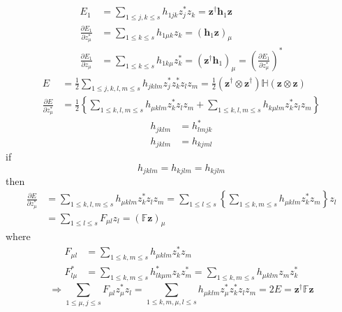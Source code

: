 \documentclass[aps,preprint]{revtex4}%
\begin{document}
\begin{align}
E_{1}  & =\sum_{1\leq j,k\leq s}h_{1jk}z_{j}^{\ast}z_{k}=\mathbf{z}^{\dagger
}\mathbf{h}_{1}\mathbf{z}\\
\frac{\partial E_{1}}{\partial z_{\mu}^{\ast}}  & =\sum_{1\leq k\leq s}h_{1\mu
k}z_{k}=\left(  \mathbf{h}_{1}\mathbf{z}\right)  _{\mu}\\
\frac{\partial E_{1}}{\partial z_{\mu}}  & =\sum_{1\leq k\leq s}h_{1k\mu}%
z_{k}^{\ast}=\left(  \mathbf{z}^{\dagger}\mathbf{h}_{1}\right)  _{\mu}=\left(
\frac{\partial E_{1}}{\partial z_{\mu}^{\ast}}\right)  ^{\ast}%
\end{align}%
\begin{align}
E  & =\frac{1}{2}\sum_{1\leq j,k,l,m\leq s}h_{jklm}z_{j}^{\ast}z_{k}^{\ast
}z_{l}z_{m}=\frac{1}{2}\left(  \mathbf{z}^{\dagger}\otimes\mathbf{z}^{\dagger
}\right)  \mathbb{H}\left(  \mathbf{z\otimes z}\right)  \\
\frac{\partial E}{\partial z_{\mu}^{\ast}}  & =\frac{1}{2}\left\{  \sum_{1\leq
k,l,m\leq s}h_{\mu klm}z_{k}^{\ast}z_{l}z_{m}+\sum_{1\leq k,l,m\leq s}h_{k\mu
lm}z_{k}^{\ast}z_{l}z_{m}\right\}
\end{align}%
\begin{align}
h_{jklm}  & =h_{lmjk}^{\ast}\\
h_{jklm}  & =h_{kjml}%
\end{align}
if
\begin{equation}
h_{jklm}=h_{kjlm}=h_{kjlm}%
\end{equation}
then
\begin{align}
\frac{\partial E}{\partial z_{\mu}^{\ast}}  & =\sum_{1\leq k,l,m\leq s}h_{\mu
klm}z_{k}^{\ast}z_{l}z_{m}=\sum_{1\leq l\leq s}\left\{  \sum_{1\leq k,m\leq
s}h_{\mu klm}z_{k}^{\ast}z_{m}\right\}  z_{l}\\
& =\sum_{1\leq l\leq s}F_{\mu l}z_{l}=\left(  \mathbb{F}\mathbf{z}\right)
_{\mu}%
\end{align}
where
\begin{align}
F_{\mu l}  & =\sum_{1\leq k,m\leq s}h_{\mu klm}z_{k}^{\ast}z_{m}\\
F_{l\mu}^{\ast}  & =\sum_{1\leq k,m\leq s}h_{lk\mu m}^{\ast}z_{k}z_{m}^{\ast
}=\sum_{1\leq k,m\leq s}h_{\mu klm}z_{m}z_{k}^{\ast}%
\end{align}%
\begin{equation}
\Rightarrow\sum_{1\leq\mu,j\leq s}F_{\mu l}z_{\mu}^{\ast}z_{l}=\sum_{1\leq
k,m,\mu,l\leq s}h_{\mu klm}z_{\mu}^{\ast}z_{k}^{\ast}z_{l}z_{m}=2E=\mathbf{z}%
^{\dagger}\mathbb{F}\mathbf{z}%
\end{equation}%
\end{document}
